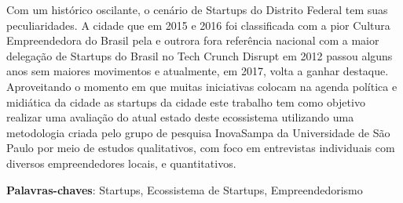 \begin{resumo}

Com um histórico oscilante, o cenário de Startups do Distrito Federal tem suas peculiaridades. A cidade que em 2015 e 2016 foi classificada com a pior Cultura Empreendedora do Brasil pela  e outrora fora referência nacional com a maior delegação de Startups do Brasil no Tech Crunch Disrupt em 2012 passou alguns anos sem maiores movimentos e atualmente, em 2017, volta a ganhar destaque. Aproveitando o momento em que muitas iniciativas colocam na agenda política e midiática da cidade as startups da cidade este trabalho tem como objetivo realizar uma avaliação do atual estado deste ecossistema utilizando uma metodologia criada pelo grupo de pesquisa InovaSampa da Universidade de São Paulo por meio de estudos qualitativos, com foco em entrevistas individuais com diversos empreendedores locais, e quantitativos.

 \vspace{\onelineskip}

 \noindent
 \textbf{Palavras-chaves}: Startups, Ecossistema de Startups, Empreendedorismo
\end{resumo}
